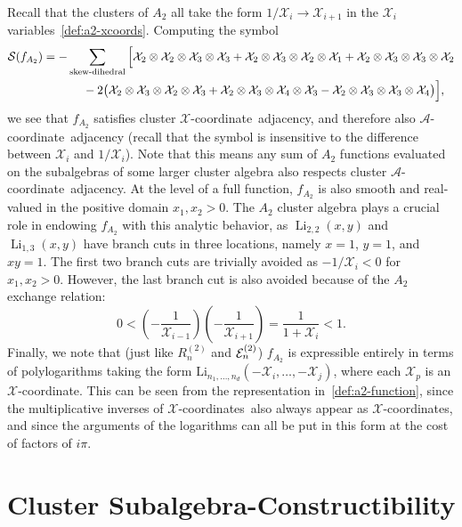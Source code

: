 \documentclass[11pt]{article}
\DeclareMathOperator{\Li}{Li}
\def\x{\mathcal{X}}
\def\xcoord{$\mathcal{X}$-coordinate}
\def\xcoords{$\mathcal{X}$-coordinates}
\def\acoord{$\mathcal{A}$-coordinate}
\begin{document}
Recall that the clusters of $A_2$ all take the form $1/\x_i\to \x_{i+1}$ in the $\x_i$ variables~\eqref{def:a2-xcoords}. Computing the symbol
\begin{align}
   {\cal S}(f_{A_2}) &= -\sum_{\text{skew-dihedral}} \Big[ \x_2\otimes\x_2\otimes\x_3\otimes\x_3+\x_2\otimes\x_3\otimes\x_2\otimes\x_1+\x_2\otimes\x_3\otimes\x_3\otimes\x_2 \nonumber
   \\&\hspace{1.2cm}-2\big(\x_2\otimes\x_3\otimes\x_2\otimes\x_3+\x_2\otimes\x_3\otimes\x_4\otimes\x_3-\x_2\otimes\x_3\otimes\x_3\otimes\x_4 \big) \Big],
\end{align}
we see that $f_{A_2}$ satisfies cluster \xcoord\ adjacency, and therefore also \acoord\ adjacency (recall that the symbol is insensitive to the difference between $\x_i$ and $1/\x_i$). Note that this means any sum of $A_2$ functions evaluated on the subalgebras of some larger cluster algebra also respects cluster \acoord\ adjacency. At the level of a full function, $f_{A_2}$ is also smooth and real-valued in the positive domain $x_1, x_2>0$. The $A_2$ cluster algebra plays a crucial role in endowing $f_{A_2}$ with this analytic behavior, as $\Li_{2,2}(x,y)$ and $\Li_{1,3}(x,y)$ have branch cuts in three locations, namely $x=1$, $y=1$, and $xy=1$. The first two branch cuts are trivially avoided as $-1/\x_i<0$ for $x_1,x_2>0$. However, the last branch cut is also avoided because of the $A_2$ exchange relation: 
\begin{equation}
	0<\left(-\frac{1}{\x_{i-1}}\right)\left(-\frac{1}{\x_{i+1}}\right) = \frac{1}{1+\x_i}<1.
\end{equation}
Finally, we note that (just like $R_n^{(2)}$ and ${\cal E}_n^{(2)}$) $f_{A_2}$ is expressible entirely in terms of polylogarithms taking the form $\text{Li}_{n_1,\dots,n_d}(-\mathcal{X}_i,\dots,-\mathcal{X}_j)$, where each $\x_p$ is an \xcoord. This can be seen from the representation in~\eqref{def:a2-function}, since the multiplicative inverses of \xcoords\ also always appear as \xcoords, and since the arguments of the logarithms can all be put in this form at the cost of factors of $i \pi$.

\section{Cluster Subalgebra-Constructibility}\label{sec:sub-constructibility} 
\end{document}
